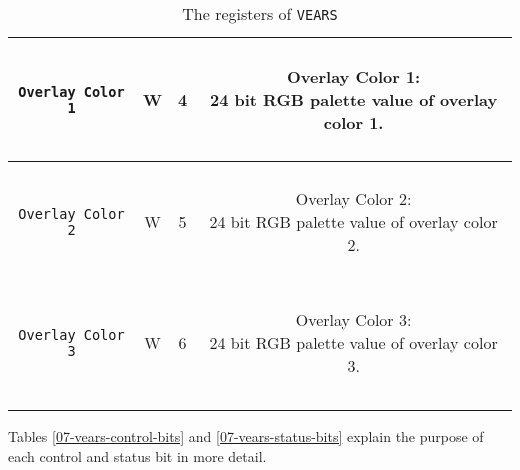 \begin{longtable}[htb]{|c|c|c|c|}
\hline 

\texttt{Overlay Color 1} & W & 4 &
\parbox{7cm}{ ~ \\ Overlay Color 1: \\ \small
24 bit RGB palette value of overlay color 1.
\\ ~ } \\

\hline 

\texttt{Overlay Color 2} & W & 5 &
\parbox{7cm}{ ~ \\ Overlay Color 2: \\ \small
24 bit RGB palette value of overlay color 2.
\\ ~ } \\

\hline 

\texttt{Overlay Color 3} & W & 6 &
\parbox{7cm}{ ~ \\ Overlay Color 3: \\ \small
24 bit RGB palette value of overlay color 3.
\\ ~ } \\

\hline 
\caption{The registers of \texttt{VEARS}}
\label{07-vears-registers}
\end{longtable}




Tables \ref{07-vears-control-bits} and \ref{07-vears-status-bits} explain the purpose of each control and status bit in more detail.


